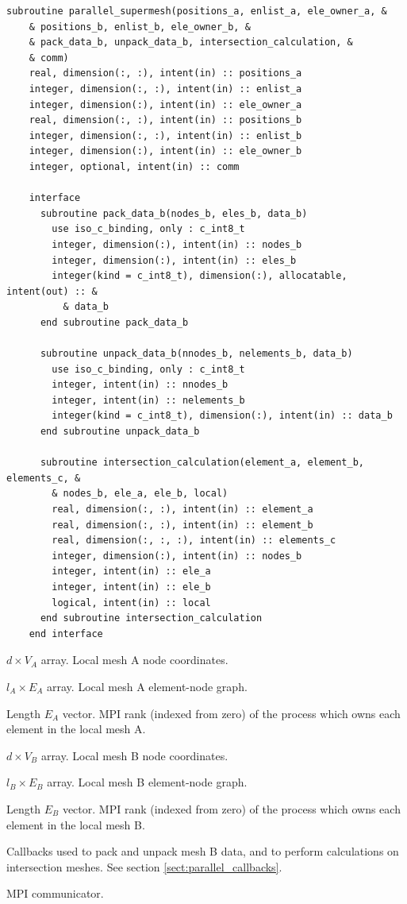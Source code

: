 \documentclass{article}
\begin{document}
\begin{lstlisting}[language=FORTRAN]
  subroutine parallel_supermesh(positions_a, enlist_a, ele_owner_a, &
    & positions_b, enlist_b, ele_owner_b, &
    & pack_data_b, unpack_data_b, intersection_calculation, &
    & comm)
    real, dimension(:, :), intent(in) :: positions_a
    integer, dimension(:, :), intent(in) :: enlist_a
    integer, dimension(:), intent(in) :: ele_owner_a
    real, dimension(:, :), intent(in) :: positions_b
    integer, dimension(:, :), intent(in) :: enlist_b
    integer, dimension(:), intent(in) :: ele_owner_b
    integer, optional, intent(in) :: comm
    
    interface
      subroutine pack_data_b(nodes_b, eles_b, data_b)
        use iso_c_binding, only : c_int8_t
        integer, dimension(:), intent(in) :: nodes_b
        integer, dimension(:), intent(in) :: eles_b
        integer(kind = c_int8_t), dimension(:), allocatable, intent(out) :: &
          & data_b
      end subroutine pack_data_b

      subroutine unpack_data_b(nnodes_b, nelements_b, data_b)
        use iso_c_binding, only : c_int8_t
        integer, intent(in) :: nnodes_b
        integer, intent(in) :: nelements_b
        integer(kind = c_int8_t), dimension(:), intent(in) :: data_b
      end subroutine unpack_data_b
      
      subroutine intersection_calculation(element_a, element_b, elements_c, &
        & nodes_b, ele_a, ele_b, local)
        real, dimension(:, :), intent(in) :: element_a
        real, dimension(:, :), intent(in) :: element_b
        real, dimension(:, :, :), intent(in) :: elements_c
        integer, dimension(:), intent(in) :: nodes_b
        integer, intent(in) :: ele_a
        integer, intent(in) :: ele_b
        logical, intent(in) :: local
      end subroutine intersection_calculation
    end interface
\end{lstlisting}

\begin{description}[font=\ttfamily\bfseries,leftmargin=2.2\parindent,labelindent=1.7\parindent,noitemsep]
  \item[positions\_a] $d \times V_A$ array. Local mesh A node coordinates.
  \item[enlist\_a] $l_A \times E_A$ array. Local mesh A element-node graph.
  \item[ele\_owner\_a] Length $E_A$ vector. MPI rank (indexed from zero) of the
    process which owns each element in the local mesh A.
  \item[positions\_b] $d \times V_B$ array. Local mesh B node coordinates.
  \item[enlist\_b] $l_B \times E_B$ array. Local mesh B element-node graph.
  \item[ele\_owner\_b] Length $E_B$ vector. MPI rank (indexed from zero) of the
    process which owns each element in the local mesh B.
  \item[pack\_data\_b, unpack\_data\_b, intersection\_calculation] Callbacks
    used to pack and unpack mesh B data, and to perform calculations on
    intersection meshes. See section \ref{sect:parallel_callbacks}.
  \item[comm] MPI communicator.
\end{description}
\end{document}

